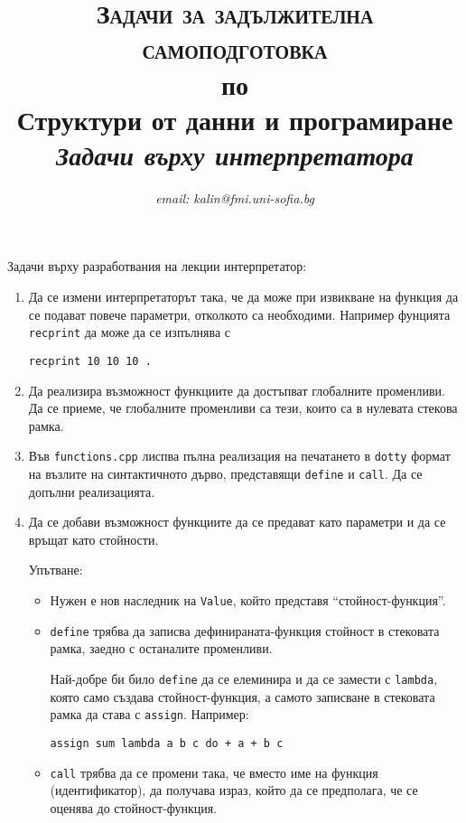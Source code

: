 \documentclass[12pt,a4paper]{article}
\author{\textit{email: kalin@fmi.uni-sofia.bg}}
\title{\textsc{Задачи за задължителна самоподготовка} \\
по \\
Структури от данни и програмиране\\
\textit{Задачи върху интерпретатора}}
\begin{document}
\maketitle

Задачи върху разработвания на лекции интерпретатор:

\begin{enumerate}
	\item Да се измени интерпретаторът така, че да може при извикване на функция да се подават повече параметри, отколкото са необходими. Например фунцията \texttt{recprint} да може да се изпълнява с

	 \texttt{recprint 10 10 10 .}


	\item Да реализира възможност функциите да достъпват глобалните променливи. Да се приеме, че глобалните променливи са тези, които са в нулевата стекова рамка.

	\item Във \texttt{functions.cpp} лиспва пълна реализация на печатането в \texttt{dotty} формат на възлите на синтактичното дърво, представящи \texttt{define} и \texttt{call}. Да се допълни реализацията.

	\item Да се добави възможност функциите да се предават като параметри и да се връщат като стойности. 

	\begin{flushleft}
	Упътване: 
	\begin{itemize}
		\item Нужен е нов наследник на \texttt{Value}, който представя ``стойност-функция''. 
		\item \texttt{define} трябва да записва дефинираната-функция стойност в стековата рамка, заедно с останалите променливи. 

		Най-добре би било \texttt{define} да се елеминира и да се замести с \texttt{lambda}, която само създава стойност-функция, а самото записване в стековата рамка да става с \texttt{assign}. Например:

		\texttt{assign sum lambda a b c do + a + b c}


		\item \texttt{call} трябва да се промени така, че вместо име на функция (идентификатор), да получава израз, който да се предполага, че се оценява до стойност-функция. 
	\end{itemize}
		
	\end{flushleft}
\end{enumerate}
\end{document}

